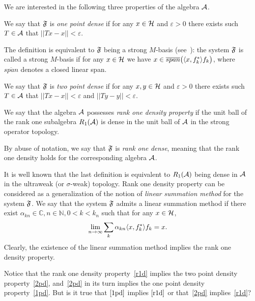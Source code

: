 \documentclass[12pt,oneside,a4paper]{amsart}
\begin{document}
  We are interested in the following three properties of the algebra $\cal{A}$.
  \begin{definition}
    \label{1pd}
    We say that $\fsys$ is \emph{one point dense} if for any $x \in \cal{H}$ and $\varepsilon > 0$
      there exists such $T\in \cal{A}$ that $||Tx - x|| < \varepsilon$.

  \end{definition}
    The definition is equivalent to $\fsys$ being a strong $M$-basis (see~\cite{katavolos}):
    the system $\fsys$ is called a strong $M$-basis if for any $x\in\cal{H}$ we have $x \in \overline{span}\big(\inner{x}{f^*_k}f_k\big)$, where
      $\overline{span}$ denotes a closed linear span.
  \begin{definition}
    \label{2pd}
    We say that $\fsys$ is \emph{two point dense} if for any $x, y \in \cal{H}$ and $\varepsilon > 0$
      there exists such $T\in \cal{A}$ that $||Tx - x|| < \varepsilon$ and $||Ty - y|| < \varepsilon$.
  \end{definition}
  \begin{definition}
    \label{r1d}
    We say that the algebra $\cal{A}$ possesses \emph{rank one density property} if
      the unit ball of the rank one subalgebra $R_1(\cal{A})$ is dense in the unit ball of $\cal{A}$ in the strong operator topology.
  \end{definition}
  By abuse of notation, we say that $\fsys$ is \emph{rank one dense}, meaning that the rank one density holds for the corresponding algebra $\cal{A}$.

  It is well known that the last definition is equivalent to $R_1(\cal{A})$ being dense
    in $\cal{A}$ in the ultraweak (or $\sigma$-weak) topology.
  Rank one density property can be considered as a generalization of the notion of \emph{linear summation method} for the system $\fsys$.
  We say that the system $\fsys$ admits a linear summation method if there exist $\alpha_{kn} \in \mathbb{C}, n \in \mathbb{N}, 0 < k < k_n$
    such that for any $x \in \cal{H}$,
    \[
      \lim_{n \to \infty} \sum_k \alpha_{kn} \inner{x}{f^*_k}f_k = x.
    \]
  Clearly, the existence of the linear summation method implies the rank one density property.

  Notice that the rank one density property~\eqref{r1d} implies the two point density property~\eqref{2pd}, and~\eqref{2pd}
    in its turn implies the one point density property~\eqref{1pd}.
  But is it true that $\eqref{1pd}$ implies $\eqref{r1d}$ or that~\eqref{2pd} implies~\eqref{r1d}?
\end{document}
